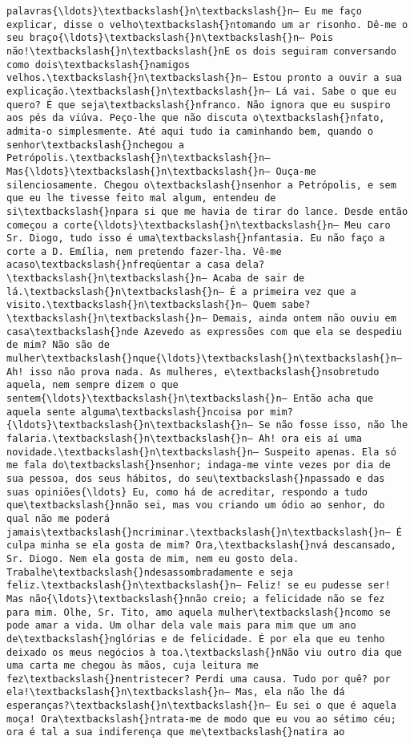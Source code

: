 \begin{Verbatim}[commandchars=\\\{\}]
palavras{\ldots}\textbackslash{}n\textbackslash{}n— Eu me faço explicar, disse o velho\textbackslash{}ntomando um ar risonho. Dê-me o seu braço{\ldots}\textbackslash{}n\textbackslash{}n— Pois não!\textbackslash{}n\textbackslash{}nE os dois seguiram conversando como dois\textbackslash{}namigos velhos.\textbackslash{}n\textbackslash{}n— Estou pronto a ouvir a sua explicação.\textbackslash{}n\textbackslash{}n— Lá vai. Sabe o que eu quero? É que seja\textbackslash{}nfranco. Não ignora que eu suspiro aos pés da viúva. Peço-lhe que não discuta o\textbackslash{}nfato, admita-o simplesmente. Até aqui tudo ia caminhando bem, quando o senhor\textbackslash{}nchegou a Petrópolis.\textbackslash{}n\textbackslash{}n— Mas{\ldots}\textbackslash{}n\textbackslash{}n— Ouça-me silenciosamente. Chegou o\textbackslash{}nsenhor a Petrópolis, e sem que eu lhe tivesse feito mal algum, entendeu de si\textbackslash{}npara si que me havia de tirar do lance. Desde então começou a corte{\ldots}\textbackslash{}n\textbackslash{}n— Meu caro Sr. Diogo, tudo isso é uma\textbackslash{}nfantasia. Eu não faço a corte a D. Emília, nem pretendo fazer-lha. Vê-me acaso\textbackslash{}nfreqüentar a casa dela?\textbackslash{}n\textbackslash{}n— Acaba de sair de lá.\textbackslash{}n\textbackslash{}n— É a primeira vez que a visito.\textbackslash{}n\textbackslash{}n— Quem sabe?\textbackslash{}n\textbackslash{}n— Demais, ainda ontem não ouviu em casa\textbackslash{}nde Azevedo as expressões com que ela se despediu de mim? Não são de mulher\textbackslash{}nque{\ldots}\textbackslash{}n\textbackslash{}n— Ah! isso não prova nada. As mulheres, e\textbackslash{}nsobretudo aquela, nem sempre dizem o que sentem{\ldots}\textbackslash{}n\textbackslash{}n— Então acha que aquela sente alguma\textbackslash{}ncoisa por mim?{\ldots}\textbackslash{}n\textbackslash{}n— Se não fosse isso, não lhe falaria.\textbackslash{}n\textbackslash{}n— Ah! ora eis aí uma novidade.\textbackslash{}n\textbackslash{}n— Suspeito apenas. Ela só me fala do\textbackslash{}nsenhor; indaga-me vinte vezes por dia de sua pessoa, dos seus hábitos, do seu\textbackslash{}npassado e das suas opiniões{\ldots} Eu, como há de acreditar, respondo a tudo que\textbackslash{}nnão sei, mas vou criando um ódio ao senhor, do qual não me poderá jamais\textbackslash{}ncriminar.\textbackslash{}n\textbackslash{}n— É culpa minha se ela gosta de mim? Ora,\textbackslash{}nvá descansado, Sr. Diogo. Nem ela gosta de mim, nem eu gosto dela. Trabalhe\textbackslash{}ndesassombradamente e seja feliz.\textbackslash{}n\textbackslash{}n— Feliz! se eu pudesse ser! Mas não{\ldots}\textbackslash{}nnão creio; a felicidade não se fez para mim. Olhe, Sr. Tito, amo aquela mulher\textbackslash{}ncomo se pode amar a vida. Um olhar dela vale mais para mim que um ano de\textbackslash{}nglórias e de felicidade. É por ela que eu tenho deixado os meus negócios à toa.\textbackslash{}nNão viu outro dia que uma carta me chegou às mãos, cuja leitura me fez\textbackslash{}nentristecer? Perdi uma causa. Tudo por quê? por ela!\textbackslash{}n\textbackslash{}n— Mas, ela não lhe dá esperanças?\textbackslash{}n\textbackslash{}n— Eu sei o que é aquela moça! Ora\textbackslash{}ntrata-me de modo que eu vou ao sétimo céu; ora é tal a sua indiferença que me\textbackslash{}natira ao 
\end{Verbatim}
